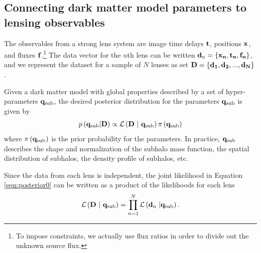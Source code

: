 \subsection{Connecting dark matter model parameters to lensing observables}
\label{ssect:overview}

The observables from a strong lens system are image time delays $\bf{t}$, positions $\bf{x}$, and fluxes $\bf{f}$.\footnote{To impose constraints, we actually use flux ratios in order to divide out the unknown source flux.} The data vector for the $n$th lens can be written ${\bf{d}_{\rm{n}}} = \left\lbrace \bf{x}_n,\bf{t}_n,{\bf{f_n}}\right\rbrace$, and we represent the dataset for a sample of $N$ lenses as set ${\bf{D}} = \left\lbrace\bf{d}_1,\bf{d}_2,...,\bf{d}_N\right\rbrace$. 

Given a dark matter model with global properties described by a set of hyper-parameters ${\bf{q}_{\rm{sub}}}$, the desired posterior distribution for the parameters ${\bf{q}_{\rm{sub}}}$ is given by
\begin{equation}
\label{eqn:posterior0}
p\left(\qsub | \Data \right) \propto {\mathcal{L}}\left(\Data \ | \ \qsub \right) \pi\left(\qsub\right)
\end{equation}
where $\pi\left({\bf{q}_{\rm{sub}}}\right)$ is the prior probability for the parameters. In practice, ${\bf{q}_{\rm{sub}}}$ describes the shape and normalization of the subhalo mass function, the spatial distribution of subhalos, the density profile of subhalos, etc. 

Since the data from each lens is independent, the joint likelihood in Equation \ref{eqn:posterior0} can be written as a product of the likelihoods for each lens
\begin{equation}
\label{eqn:joint_like}
{\mathcal{L}}\left({\bf{D}} \ | \ {\bf{q}_{\rm{sub}}} \right) = \prod_{n=1}^{N} {\mathcal{L}} \left({\bf{d}_{\rm{n}}} \ | {\bf{q}_{\rm{sub}}}\right).
\end{equation}

